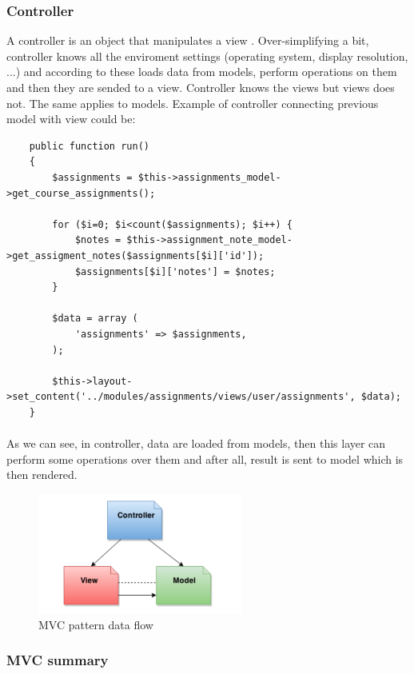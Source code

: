 \subsubsection{Controller}
A controller is an object that manipulates a view \cite{mvc}. Over-simplifying a bit, controller knows all the enviroment settings (operating system, display resolution, ...) and according to these loads data from models, perform operations on them and then they are sended to a view. Controller knows the views but views does not. The same applies to models. Example of controller connecting previous model with view could be:

\begin{lstlisting}
    public function run()
    {
        $assignments = $this->assignments_model->get_course_assignments();

        for ($i=0; $i<count($assignments); $i++) {
            $notes = $this->assignment_note_model->get_assigment_notes($assignments[$i]['id']);
            $assignments[$i]['notes'] = $notes;
        }

        $data = array (
            'assignments' => $assignments,
        );

        $this->layout->set_content('../modules/assignments/views/user/assignments', $data);
    }
\end{lstlisting}

\paragraph{}
As we can see, in controller, data are loaded from models, then this layer can perform some operations over them and after all, result is sent to model which is then rendered.


\begin{figure}[h]
    \centering
    \includegraphics[width=0.6\textwidth]{courses/mvc.png}
    \caption{MVC pattern data flow}
    \label{mvc_data_flow}
\end{figure}

\subsubsection{MVC summary}
